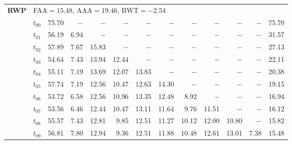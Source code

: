 \begin{table}[ht]
\begin{tabular}{@{}l l r r r r r r r r r r r@{}}
\midrule
\multirow{11}{*}{\textbf{RWP}} & \multicolumn{12}{l}{\quad\small FAA$=15.48$,\; AAA$=19.46$,\; BWT$=-2.54$} \\
 & $t_{00}$ & 75.70 & $-$ & $-$ & $-$ & $-$ & $-$ & $-$ & $-$ & $-$ & $-$ & 75.70 \\
 & $t_{01}$ & 56.19 & 6.94 & $-$ & $-$ & $-$ & $-$ & $-$ & $-$ & $-$ & $-$ & 31.57 \\
 & $t_{02}$ & 57.89 & 7.67 & 15.83 & $-$ & $-$ & $-$ & $-$ & $-$ & $-$ & $-$ & 27.13 \\
 & $t_{03}$ & 54.64 & 7.43 & 13.94 & 12.44 & $-$ & $-$ & $-$ & $-$ & $-$ & $-$ & 22.11 \\
 & $t_{04}$ & 55.11 & 7.19 & 13.69 & 12.07 & 13.83 & $-$ & $-$ & $-$ & $-$ & $-$ & 20.38 \\
 & $t_{05}$ & 57.74 & 7.19 & 12.56 & 10.47 & 12.63 & 14.30 & $-$ & $-$ & $-$ & $-$ & 19.15 \\
 & $t_{06}$ & 53.72 & 6.58 & 12.56 & 10.96 & 13.35 & 12.48 & 8.92 & $-$ & $-$ & $-$ & 16.94 \\
 & $t_{07}$ & 53.56 & 6.46 & 12.44 & 10.47 & 13.11 & 11.64 & 9.76 & 11.51 & $-$ & $-$ & 16.12 \\
 & $t_{08}$ & 55.57 & 7.43 & 12.81 & 9.85 & 12.51 & 11.27 & 10.12 & 12.00 & 10.80 & $-$ & 15.82 \\
 & $t_{09}$ & 56.81 & 7.80 & 12.94 & 9.36 & 12.51 & 11.88 & 10.48 & 12.61 & 13.01 & 7.38 & 15.48 \\
\bottomrule
\end{tabular}
\end{table}

